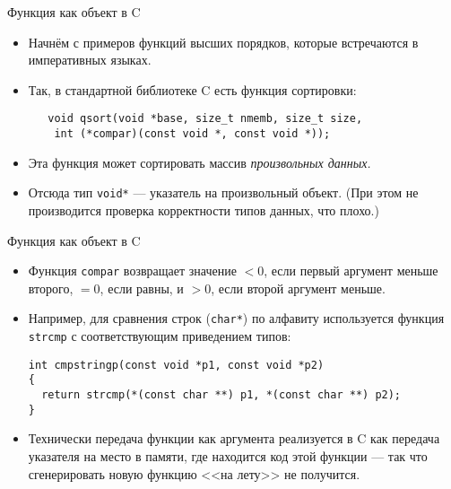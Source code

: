 \documentclass[xcolor=dvipsnames]{beamer}
\begin{document}
\begin{frame}[fragile]{Функция как объект в C}
 
\begin{itemize}[<+->]
  \item Начнём с примеров функций высших порядков, которые встречаются в императивных языках.
  \item Так, в стандартной библиотеке C есть функция сортировки:
  \begin{verbatim}
   void qsort(void *base, size_t nmemb, size_t size,
    int (*compar)(const void *, const void *));
  \end{verbatim}

  \item Эта функция может сортировать массив {\em произвольных данных.}
  \item Отсюда тип \texttt{void*} --- указатель на произвольный объект. (При этом не производится проверка корректности типов данных, что плохо.)
\end{itemize}

\end{frame}

\begin{frame}[fragile]{Функция как объект в C}
 
\begin{itemize}[<+->]
 \item Функция \texttt{compar} возвращает значение $<0$, если первый аргумент меньше второго, $=0$, если равны, и $>0$, если второй аргумент меньше.
 \item Например, для сравнения строк (\texttt{char*}) по алфавиту используется функция \texttt{strcmp} с соответствующим приведением типов:
 \begin{verbatim}
int cmpstringp(const void *p1, const void *p2)
{
  return strcmp(*(const char **) p1, *(const char **) p2);
}
 \end{verbatim}
\item Технически передача функции как аргумента реализуется в C как передача указателя на место в памяти, где находится код этой функции --- так что сгенерировать новую функцию <<на лету>> не получится.
\end{itemize}

 
\end{frame}
\end{document}

